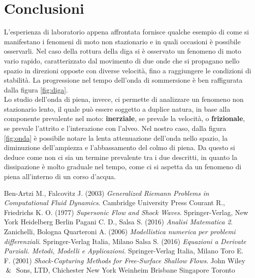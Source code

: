 \documentclass[12pt]{article} %
\begin{document}
\newpage

\section{Conclusioni}
\noindent L'esperienza di laboratorio appena affrontata fornisce qualche esempio di come si manifestano i fenomeni di moto non stazionario e in quali occasioni è possibile osservarli.
Nel caso della rottura della diga si è osservato un fenomeno di moto vario rapido, caratterizzato dal movimento di due onde che si propagano nello spazio in direzioni opposte con diverse velocità, fino a raggiungere le condizioni di stabilità. La progressione nel tempo dell'onda di sommersione è ben raffigurata dalla figura \ref{fig:diga}.\\
Lo studio dell'onda di piena, invece, ci permette di analizzare un fenomeno non stazionario lento, il quale può essere soggetto a duplice natura, in base alla componente prevalente nel moto: \textbf{inerziale}, se prevale la velocità, o \textbf{frizionale}, se prevale l'attrito e l'interazione con l'alveo. Nel nostro caso, dalla figura \ref{fig:onda} è possibile notare la lenta attenuazione dell'onda nello spazio, la diminuzione dell'ampiezza e l'abbassamento del colmo di piena. Da questo si deduce come non ci sia un termine prevalente tra i due descritti, in quanto la dissipazione è molto graduale nel tempo, come ci si aspetta da un fenomeno di piena all'interno di un corso d'acqua.





\newpage
\begin{thebibliography}{}
Ben-Artzi M., Falcovitz J. (2003) \textit{Generalized Riemann Problems in Computational Fluid Dynamics}. Cambridge University Press
Courant R., Friedrichs K. O. (1977) \textit{Supersonic Flow and Shock Waves}. Springer-Verlag, New York Heidelberg Berlin
Pagani C. D., Salsa S. (2016) \textit{Analisi Matematica 2}. Zanichelli, Bologna
Quarteroni A. (2006) \textit{Modellistica numerica per problemi differenziali}. Springer-Verlag Italia, Milano
Salsa S. (2016) \textit{Equazioni a Derivate Parziali. Metodi, Modelli e Applicazioni}. Springer-Verlag Italia, Milano
Toro E. F. (2001) \textit{Shock-Capturing Methods for Free-Surface Shallow Flows}. John Wiley $\And$ Sons, LTD, Chichester New York Weinheim Brisbane Singapore Toronto 
\end{thebibliography}
\end{document}
